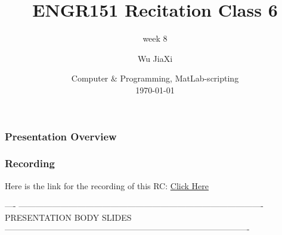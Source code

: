 \documentclass[
	11pt, %
]{beamer}
\title[Computer \& Programming, MATLAB]{ENGR151 Recitation Class 6} %
\subtitle{week 8} %
\author[Wu JiaXi]{Wu JiaXi} %
\institute[UM-SJTU joint institute]{UM-SJTU joint institute \\ \smallskip \textit{nina$\_$nhk@sjtu.edu.cn}} %
\date[\today]{Computer $\&$ Programming, MatLab-scripting \\ \today} %
\begin{document}

\begin{frame}
	\titlepage %
\end{frame}



\begin{frame}
	\frametitle{Presentation Overview} %
	
	\tableofcontents %
\end{frame}


\begin{frame}
	\frametitle{Recording} %
	
	Here is the link for the recording of this RC: \href{https://sjtu.feishu.cn/minutes/obcnw1h35g9wd599qt28pdq7?from=from_copylink}{Click Here}
\end{frame}
----
----------------------------------------------------------------------------------------
	PRESENTATION BODY SLIDES
----------------------------------------------------------------------------------------
\end{document}
